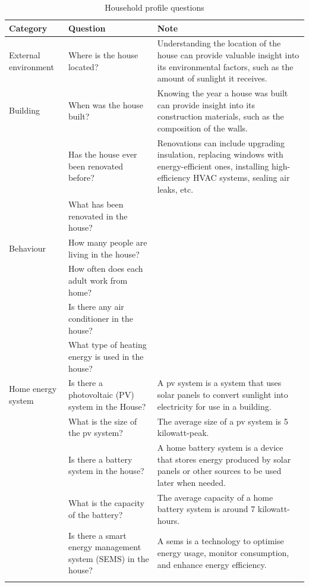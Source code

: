 \begin{center}
  \small
    \begin{longtable}{ | p{} | p{} | p{} | }
        \hline
        \textbf{Category} & \textbf{Question} & \textbf{Note} \\
        \hline
        External environment & Where is the house located? & Understanding the location of the house can provide valuable insight into its environmental factors, such as the amount of sunlight it receives. \\
        \hline
        Building & When was the house built? & Knowing the year a house was built can provide insight into its construction materials, such as the composition of the walls. \\
          & Has the house ever been renovated before? & Renovations can include upgrading insulation, replacing windows with energy-efficient ones, installing high-efficiency HVAC systems, sealing air leaks, etc. \\
          & What has been renovated in the house? &   \\
        \hline
        Behaviour & How many people are living in the house? &   \\
          & How often does each adult work from home? &   \\
          & Is there any air conditioner in the house? &   \\
          & What type of heating energy is used in the house? &   \\
        \hline
        Home energy system  & Is there a photovoltaic (PV) system in the House? & A \gls{pv} system is a system that uses solar panels to convert sunlight into electricity for use in a building. \\    
          & What is the size of the \gls{pv} system? & The average size of a \gls{pv} system is 5 kilowatt-peak. \\
          & Is there a battery system in the house? & A home battery system is a device that stores energy produced by solar panels or other sources to be used later when needed. \\
          & What is the capacity of the battery? & The average capacity of a home battery system is around 7 kilowatt-hours. \\
          & Is there a smart energy management system (SEMS) in the house? & A \gls{sems} is a technology to optimise energy usage, monitor consumption, and enhance energy efficiency. \\
        \hline
    \caption{Household profile questions}
    \label{tab:questions}
    \end{longtable}
\end{center}

